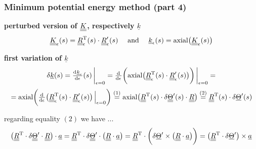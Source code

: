 \begin{frame}
  \frametitle{Minimum potential energy method (part 4)}
  
  \textbf{perturbed version of $\underline{\underline{K}}$, respectively $\underline{k}$}
  \begin{displaymath}
    \underline{\underline{K}}_{\epsilon}(s) =
    \underline{\underline{R}}_{\epsilon}^{\mathrm{T}}(s) \cdot \underline{\underline{R}}_{\epsilon}^{\prime}(s)
    \quad \text{ and } \quad
    \underline{k}_{\epsilon}(s) = \mathrm{axial} \bigl( \underline{\underline{K}}_{\epsilon}(s) \bigr)
  \end{displaymath}
  
  \vspace{0.5em}
  \textbf{first variation of $\underline{k}$}
  \begin{displaymath}
    \label{eq:fist_variation_of_k}
    \delta \underline{k}(s) =
    \od{\underline{k}_{\epsilon}}{\epsilon}(s) \sVert[3]_{\epsilon=0} =
    \od{}{\epsilon} \biggl( \axial \bigl( \doubleunderline{R}_{\epsilon}^{\mathrm{T}}(s) \cdot \doubleunderline{R}_{\epsilon}^{\prime}(s) \bigr) \biggr) \sVert[3]_{\epsilon=0} =
  \end{displaymath}
  \begin{displaymath}
    = \axial \biggl( \od{}{\epsilon} \bigl( \doubleunderline{R}_{\epsilon}^{\mathrm{T}}(s) \cdot \doubleunderline{R}_{\epsilon}^{\prime}(s) \bigr) \sVert[2]_{\epsilon=0} \biggr) \overset{(1)}{=}
    \axial \bigl( \doubleunderline{R}^{\mathrm{T}}(s) \cdot \delta \doubleunderline{\Theta}^{\prime}(s) \cdot \doubleunderline{R} \bigr) \overset{(2)}{=}
    \doubleunderline{R}^{\mathrm{T}}(s) \cdot \delta \underline{\Theta}^{\prime}(s)      
  \end{displaymath}
  
  \vspace{0.5em}
  regarding equality $(2)$ we have ...
  \begin{displaymath}
    \bigl( \underline{\underline{R}}^{\mathrm{T}} \cdot \delta \underline{\underline{\Theta}}^{\prime} \cdot \underline{\underline{R}} \bigr) \cdot \underline{a} =
    \underline{\underline{R}}^{\mathrm{T}} \cdot \delta \underline{\underline{\Theta}}^{\prime} \cdot \bigl( \underline{\underline{R}} \cdot \underline{a} \bigr) =
    \underline{\underline{R}}^{\mathrm{T}} \cdot \biggl( \delta \underline{\Theta}^{\prime} \times \bigl( \underline{\underline{R}} \cdot \underline{a} \bigr) \biggr) =
    \bigl( \underline{\underline{R}}^{\mathrm{T}} \cdot \delta \underline{\Theta}^{\prime} \bigr) \times \underline{a}
  \end{displaymath}
\end{frame}


